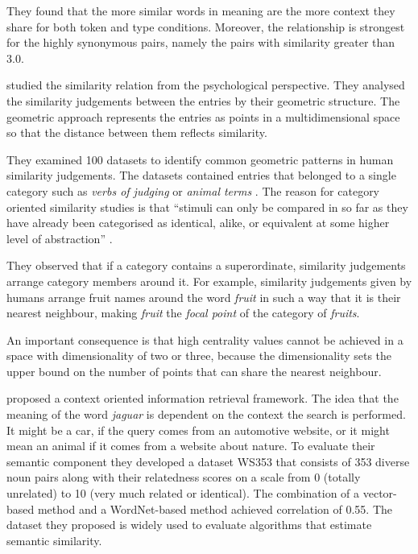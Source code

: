 They found that the more similar words in meaning are the more context they share for both token and type conditions. Moreover, the relationship is strongest for the highly synonymous pairs, namely the pairs with similarity greater than 3.0.

 studied the similarity relation from the psychological perspective. They analysed the similarity judgements between the entries by their geometric structure. The geometric approach represents the entries as points in a multidimensional space so that the distance between them reflects similarity.

They examined 100 datasets to identify common geometric patterns in human similarity judgements. The datasets contained entries that belonged to a single category such as \textit{verbs of judging} \cite{FILLENBAUM197454} or \textit{animal terms} \cite{HENLEY1969176}. The reason for category oriented similarity studies is that ``stimuli can only be compared in so far as they have already been categorised as identical, alike, or equivalent at some higher level of abstraction'' \cite{turner1987rediscovering}.

They observed that if a category contains a superordinate, similarity judgements arrange category members around it. For example, similarity judgements given by humans arrange fruit names around the word \textit{fruit} in such a way that it is their nearest neighbour, making \textit{fruit} the \emph{focal point} of the category of \textit{fruits}.

An important consequence is that high centrality values cannot be achieved in a space with dimensionality of two or three,  because the dimensionality sets the upper bound on the number of points that can share the nearest neighbour.



 proposed a context oriented information retrieval framework. The idea that the meaning of the word \textit{jaguar} is dependent on the context the search is performed. It might be a car, if the query comes from an automotive website, or it might mean an animal if it comes from a website about nature. To evaluate their semantic component they developed a dataset WS353 that consists of 353 diverse noun pairs along with their relatedness scores on a scale from 0 (totally unrelated) to 10 (very much related or identical). The combination of a vector-based method and a WordNet-based method achieved correlation of 0.55. The dataset they proposed is widely used to evaluate algorithms that estimate semantic similarity.

